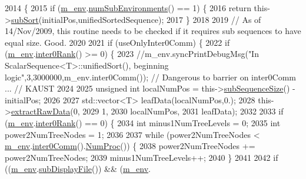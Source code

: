 \begin{DoxyCode}
2014 \{
2015   \textcolor{keywordflow}{if} (\hyperlink{class_q_u_e_s_o_1_1_scalar_sequence_a71618cd6351b29361b437af68447a4c8}{m\_env}.\hyperlink{class_q_u_e_s_o_1_1_base_environment_ac0345f57e31ef7833e379ed972bd094d}{numSubEnvironments}() == 1) \{
2016     \textcolor{keywordflow}{return} this->\hyperlink{class_q_u_e_s_o_1_1_scalar_sequence_ae0cf4dcb27543caefc38e921968cdb6c}{subSort}(initialPos,unifiedSortedSequence);
2017   \}
2018 
2019   \textcolor{comment}{// As of 14/Nov/2009, this routine needs to be checked if it requires sub sequences to have equal size.
       Good.}
2020 
2021   \textcolor{keywordflow}{if} (useOnlyInter0Comm) \{
2022     \textcolor{keywordflow}{if} (\hyperlink{class_q_u_e_s_o_1_1_scalar_sequence_a71618cd6351b29361b437af68447a4c8}{m\_env}.\hyperlink{class_q_u_e_s_o_1_1_base_environment_ae106b5bb8a80b655b88b3a26b1e7c185}{inter0Rank}() >= 0) \{
2023       \textcolor{comment}{//m\_env.syncPrintDebugMsg("In ScalarSequence<T>::unifiedSort(), beginning
       logic",3,3000000,m\_env.inter0Comm()); // Dangerous to barrier on inter0Comm ... // KAUST}
2024 
2025       \textcolor{keywordtype}{unsigned} \textcolor{keywordtype}{int} localNumPos = this->\hyperlink{class_q_u_e_s_o_1_1_scalar_sequence_a0288ea295eedc216a1617b3286f6f3a0}{subSequenceSize}() - initialPos;
2026 
2027       std::vector<T> leafData(localNumPos,0.);
2028       this->\hyperlink{class_q_u_e_s_o_1_1_scalar_sequence_a998c8f01c49c06076f2ce97a51d4ab2c}{extractRawData}(0,
2029                            1,
2030                            localNumPos,
2031                            leafData);
2032 
2033       \textcolor{keywordflow}{if} (\hyperlink{class_q_u_e_s_o_1_1_scalar_sequence_a71618cd6351b29361b437af68447a4c8}{m\_env}.\hyperlink{class_q_u_e_s_o_1_1_base_environment_ae106b5bb8a80b655b88b3a26b1e7c185}{inter0Rank}() == 0) \{
2034         \textcolor{keywordtype}{int} minus1NumTreeLevels = 0;
2035         \textcolor{keywordtype}{int} power2NumTreeNodes  = 1;
2036 
2037         \textcolor{keywordflow}{while} (power2NumTreeNodes < \hyperlink{class_q_u_e_s_o_1_1_scalar_sequence_a71618cd6351b29361b437af68447a4c8}{m\_env}.\hyperlink{class_q_u_e_s_o_1_1_base_environment_a689e4d140c74d495d97eb498714a4b82}{inter0Comm}().\hyperlink{class_q_u_e_s_o_1_1_mpi_comm_aa780721ae0fdeabc5a15e04cb0cad964}{NumProc}()) \{
2038           power2NumTreeNodes += power2NumTreeNodes;
2039           minus1NumTreeLevels++;
2040         \}
2041 
2042         \textcolor{keywordflow}{if} ((\hyperlink{class_q_u_e_s_o_1_1_scalar_sequence_a71618cd6351b29361b437af68447a4c8}{m\_env}.\hyperlink{class_q_u_e_s_o_1_1_base_environment_a8a0064746ae8dddfece4229b9ad374d6}{subDisplayFile}()) && (\hyperlink{class_q_u_e_s_o_1_1_scalar_sequence_a71618cd6351b29361b437af68447a4c8}{m\_env}.

\end{DoxyCode}
